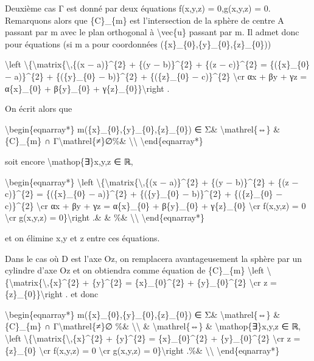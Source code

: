 \documentclass[]{article}
\begin{document}
Deuxième cas Γ est donné par deux équations f(x,y,z) = 0,g(x,y,z) = 0.
Remarquons alors que \{C\}\_\{m\} est l'intersection de la sphère de
centre A passant par m avec le plan orthogonal à
\textbackslash{}vec\{u\} passant par m. Il admet donc pour équations (si
m a pour coordonnées (\{x\}\_\{0\},\{y\}\_\{0\},\{z\}\_\{0\}))

\textbackslash{}left
\textbackslash{}\{\textbackslash{}matrix\{\textbackslash{},\{(x −
a)\}\^{}\{2\} + \{(y − b)\}\^{}\{2\} + \{(z − c)\}\^{}\{2\} =
\{(\{x\}\_\{0\} − a)\}\^{}\{2\} + \{(\{y\}\_\{0\} − b)\}\^{}\{2\} +
\{(\{z\}\_\{0\} − c)\}\^{}\{2\} \textbackslash{}cr αx + βy + γz =
α\{x\}\_\{0\} + β\{y\}\_\{0\} + γ\{z\}\_\{0\}\}\textbackslash{}right .

On écrit alors que

\textbackslash{}begin\{eqnarray*\}
m(\{x\}\_\{0\},\{y\}\_\{0\},\{z\}\_\{0\}) ∈ Σ\&
\textbackslash{}mathrel\{⇔\} \& \{C\}\_\{m\} ∩
Γ\textbackslash{}mathrel\{≠\}∅\%\& \textbackslash{}\textbackslash{}
\textbackslash{}end\{eqnarray*\}

soit encore \textbackslash{}mathop\{∃\}x,y,z ∈ ℝ,

\textbackslash{}begin\{eqnarray*\} \textbackslash{}left
\textbackslash{}\{\textbackslash{}matrix\{\textbackslash{},\{(x −
a)\}\^{}\{2\} + \{(y − b)\}\^{}\{2\} + \{(z − c)\}\^{}\{2\} =
\{(\{x\}\_\{0\} − a)\}\^{}\{2\} + \{(\{y\}\_\{0\} − b)\}\^{}\{2\} +
\{(\{z\}\_\{0\} − c)\}\^{}\{2\} \textbackslash{}cr αx + βy + γz =
α\{x\}\_\{0\} + β\{y\}\_\{0\} + γ\{z\}\_\{0\} \textbackslash{}cr
f(x,y,z) = 0 \textbackslash{}cr g(x,y,z) = 0\}\textbackslash{}right .\&
\& \%\& \textbackslash{}\textbackslash{}
\textbackslash{}end\{eqnarray*\}

et on élimine x,y et z entre ces équations.

Dans le cas où D est l'axe Oz, on remplacera avantageusement la sphère
par un cylindre d'axe Oz et on obtiendra comme équation de \{C\}\_\{m\}
\textbackslash{}left
\textbackslash{}\{\textbackslash{}matrix\{\textbackslash{},\{x\}\^{}\{2\}
+ \{y\}\^{}\{2\} = \{x\}\_\{0\}\^{}\{2\} + \{y\}\_\{0\}\^{}\{2\}
\textbackslash{}cr z = \{z\}\_\{0\}\}\textbackslash{}right . et donc

\textbackslash{}begin\{eqnarray*\}
m(\{x\}\_\{0\},\{y\}\_\{0\},\{z\}\_\{0\}) ∈ Σ\&
\textbackslash{}mathrel\{⇔\} \& \{C\}\_\{m\} ∩
Γ\textbackslash{}mathrel\{≠\}∅ \%\& \textbackslash{}\textbackslash{} \&
\textbackslash{}mathrel\{⇔\} \& \textbackslash{}mathop\{∃\}x,y,z ∈ ℝ,
\textbackslash{}left
\textbackslash{}\{\textbackslash{}matrix\{\textbackslash{},\{x\}\^{}\{2\}
+ \{y\}\^{}\{2\} = \{x\}\_\{0\}\^{}\{2\} + \{y\}\_\{0\}\^{}\{2\}
\textbackslash{}cr z = \{z\}\_\{0\} \textbackslash{}cr f(x,y,z) = 0
\textbackslash{}cr g(x,y,z) = 0\}\textbackslash{}right .\%\&
\textbackslash{}\textbackslash{} \textbackslash{}end\{eqnarray*\}
\end{document}
